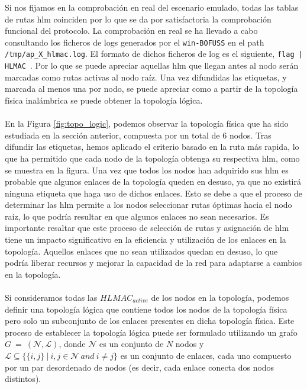 \newpage
Si nos fijamos en la comprobación en real del escenario emulado, todas las tablas de rutas \gls{hlm} coinciden por lo que se da por satisfactoria la comprobación funcional del protocolo. La comprobación en real se ha llevado a cabo consultando los ficheros de logs generados por el \texttt{win-BOFUSS} en el path \texttt{/tmp/ap\_X\_hlmac.log}. El formato de dichos ficheros de log es el siguiente, \texttt{flag | HLMAC }. Por lo que se puede apreciar aquellas \gls{hlm} que llegan antes al nodo serán marcadas como rutas activas al nodo raíz. Una vez difundidas las etiquetas, y marcada al menos una por nodo, se puede apreciar como a partir de la topología física inalámbrica se puede obtener la topología lógica.\\
\\
En la Figura \ref{fig:topo_logic}, podemos observar la topología física que ha sido estudiada en la sección anterior, compuesta por un total de 6 nodos. Tras difundir las etiquetas, hemos aplicado el criterio basado en la ruta más rapida, lo que ha permitido que cada nodo de la topología obtenga su respectiva \gls{hlm}, como se muestra en la figura. Una vez que todos los nodos han adquirido sus \gls{hlm} es probable que algunos enlaces de la topología queden en desuso, ya que no existirá ninguna etiqueta que haga uso de dichos enlaces. Esto se debe a que el proceso de determinar las \gls{hlm} permite a los nodos seleccionar rutas óptimas hacia el nodo raíz, lo que podría resultar en que algunos enlaces no sean necesarios. Es importante resaltar que este proceso de selección de rutas y asignación de \gls{hlm} tiene un impacto significativo en la eficiencia y utilización de los enlaces en la topología. Aquellos enlaces que no sean utilizados quedan en desuso, lo que podría liberar recursos y mejorar la capacidad de la red para adaptarse a cambios en la topología.\\
\\
Si consideramos todas las $HLMAC_{active}$ de los nodos en la topología, podemos definir una topología lógica que contiene todos los nodos de la topología física pero solo un subconjunto de los enlaces presentes en dicha topología física. Este proceso de establecer la topología lógica puede ser formulado utilizando un grafo $G \: = \: (\mathcal{N}, \mathcal{L})$, donde $\mathcal{N}$ es un conjunto de $N$ nodos y $\mathcal{L} \subseteq \{\{i,j\} \: | \: i,j \in \mathcal{N} \: and \: i \neq j\}$ es un conjunto de enlaces, cada uno compuesto por un par desordenado de nodos (es decir, cada enlace conecta dos nodos distintos).\\
